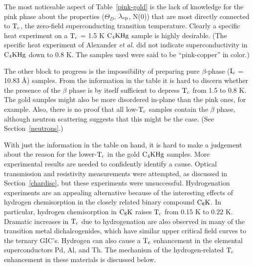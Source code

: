           The  most noticeable aspect  of Table~\ref{pink-gold} is the lack
of knowledge  for the  pink   phase  about    the properties   ($\Theta_D$,
$\rm \lambda_{ep}$, N(0))   that  are most  directly   connected   to $\rm T_c$, the
zero-field superconducting transition temperature.  Clearly a specific heat
experiment on a $\rm T_c$ = 1.5 K $\rm C_4KHg$  sample is highly desirable.
(The specific heat experiment of Alexander {\em et  al.\/} did not indicate
superconductivity in $\rm C_4KHg$ down to 0.8 K.\cite{alexander81}  The
samples used were said to be ``pink-copper'' in color.\cite{alexander81,lagrange80a})

        The other block to progress is the  impossibility of preparing pure
$\beta$-phase ($\rm I_c$ =  10.83 \AA)  samples.\cite{lagrange83}  From the
information in the table it is hard to discern whether  the presence of the
$\beta$ phase is by itself sufficient to depress $\rm T_c$  from 1.5 to 0.8
K.  The gold samples  might also be  more disordered in-plane than the pink
ones, for example.\cite{N128}  Also, there is  no proof that  all  low-$\rm
T_c$ samples  contain   the  $\beta$  phase,  although  neutron  scattering
suggests that this might be the case.  (See Section~\ref{neutrons}.)

        With just the information in the table on hand, it  is hard to make
a  judgement about the reason   for the lower-$\rm  T_c$ in  the gold  $\rm
C_4KHg$  samples.  More  experimental  results  are  needed to  confidently
identify  a cause.  Optical  transmission and resistivity measurements were
attempted, as  discussed in  Section~\ref{chardisc}, but these  experiments
were unsuccessful.  Hydrogenation  experiments are an appealing alternative
because of the interesting effects of hydrogen chemisorption in the closely
related   binary  compound  $\rm C_8K$.\cite{Z260,doll87}    In particular,
hydrogen  chemisorption  in   $\rm  C_8K$    raises $\rm T_c$     from 0.15
K\cite{koike80} to 0.22 K.\cite{kaneiwa82}  Dramatic increases in $\rm T_c$
due  to  hydrogenation are also  observed  in  many of the transition metal
dichalcogenides,\cite{friend79}  which  have similar  upper  critical field
curves to the  ternary  GIC's.   Hydrogen can  also   cause a  $\rm    T_c$
enhancement    in     the  elemental  superconductors     Pd,    Al,    and
Th\cite{stritzker78}.  The  mechanism  of  the hydrogen-related $\rm   T_c$
enhancement in these materials is discussed below.

